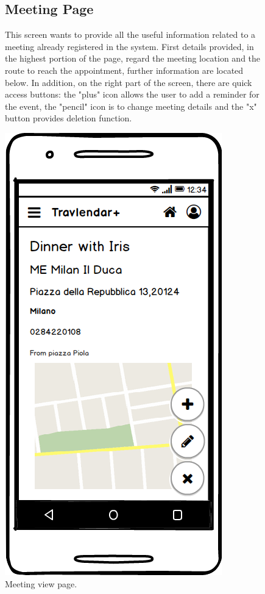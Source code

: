 	\begin{figure}
			\begin{flushleft}
			\subsection{Meeting Page}
			This screen wants to provide all the useful information related to a meeting already registered in the system. First details provided, in the highest portion of the page, regard the meeting location and the route to reach the appointment, further information are located below. In addition, on the right part of the screen, there are quick access buttons: the "plus" icon allows the user to add a reminder for the event, the "pencil" icon is to change meeting details and the "x" button provides deletion function. 
		\end{flushleft}
	\centering
	\includegraphics[width=0.6\linewidth]{mockups/MeetingView}
	\caption{Meeting view page. }
	\label{fig:meeting-view}
	\end{figure}
\clearpage

